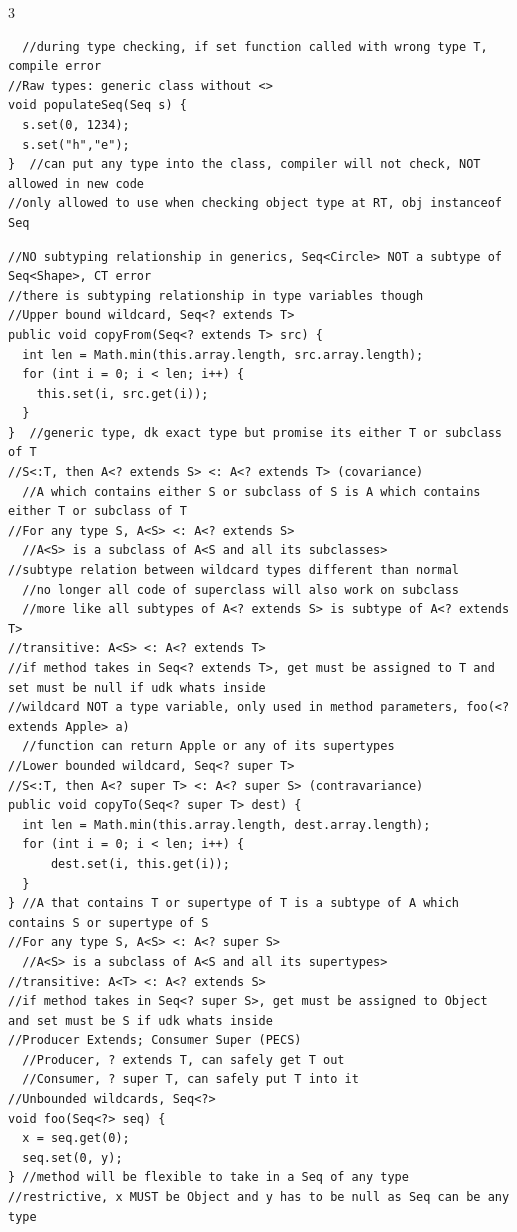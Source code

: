 \documentclass[10pt,a4paper]{article}
\begin{document}
\begin{multicols*}{3}
\begin{verbatim}
  //during type checking, if set function called with wrong type T, compile error
//Raw types: generic class without <>
void populateSeq(Seq s) {
  s.set(0, 1234);
  s.set("h","e");
}  //can put any type into the class, compiler will not check, NOT allowed in new code
//only allowed to use when checking object type at RT, obj instanceof Seq
\end{verbatim}
\begin{verbatim}
//NO subtyping relationship in generics, Seq<Circle> NOT a subtype of Seq<Shape>, CT error
//there is subtyping relationship in type variables though
//Upper bound wildcard, Seq<? extends T>
public void copyFrom(Seq<? extends T> src) {
  int len = Math.min(this.array.length, src.array.length);
  for (int i = 0; i < len; i++) {
    this.set(i, src.get(i));
  }
}  //generic type, dk exact type but promise its either T or subclass of T
//S<:T, then A<? extends S> <: A<? extends T> (covariance)
  //A which contains either S or subclass of S is A which contains either T or subclass of T
//For any type S, A<S> <: A<? extends S>
  //A<S> is a subclass of A<S and all its subclasses>
//subtype relation between wildcard types different than normal
  //no longer all code of superclass will also work on subclass
  //more like all subtypes of A<? extends S> is subtype of A<? extends T>
//transitive: A<S> <: A<? extends T>
//if method takes in Seq<? extends T>, get must be assigned to T and set must be null if udk whats inside
//wildcard NOT a type variable, only used in method parameters, foo(<? extends Apple> a)
  //function can return Apple or any of its supertypes
//Lower bounded wildcard, Seq<? super T>
//S<:T, then A<? super T> <: A<? super S> (contravariance)
public void copyTo(Seq<? super T> dest) {
  int len = Math.min(this.array.length, dest.array.length);
  for (int i = 0; i < len; i++) {
      dest.set(i, this.get(i));
  }
} //A that contains T or supertype of T is a subtype of A which contains S or supertype of S
//For any type S, A<S> <: A<? super S>
  //A<S> is a subclass of A<S and all its supertypes>
//transitive: A<T> <: A<? extends S>
//if method takes in Seq<? super S>, get must be assigned to Object and set must be S if udk whats inside
//Producer Extends; Consumer Super (PECS)
  //Producer, ? extends T, can safely get T out
  //Consumer, ? super T, can safely put T into it
//Unbounded wildcards, Seq<?>
void foo(Seq<?> seq) {
  x = seq.get(0);
  seq.set(0, y);
} //method will be flexible to take in a Seq of any type
//restrictive, x MUST be Object and y has to be null as Seq can be any type

\end{verbatim}
\end{multicols*}
\end{document}
